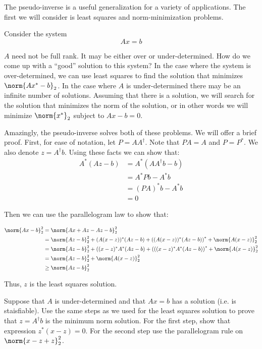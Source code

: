 

The pseudo-inverse is a useful generalization for a variety of applications. The first we will consider is least squares and norm-minimization problems.

Consider the system
\[
Ax = b
\]

$A$ need not be full rank. It may be either over or under-determined. How do we come up with a ``good'' solution to this system? In the case where the system is over-determined, we can use least squares to find the solution that minimizes $\norm{Ax^* - b}_2$. In the case where $A$ is under-determined there may be an infinite number of solutions. Assuming that there is a solution, we will search for the solution that minimizes the norm of the solution, or in other words we will minimize $\norm{x^*}_2$ subject to $Ax-b = 0$.

Amazingly, the pseudo-inverse solves both of these problems. We will offer a brief proof. First, for ease of notation, let $P = A A^\dagger$. Note that $PA = A$ and $P = P^*$. We also denote $z = A^\dagger b$. Using these facts we can show that:
\begin{align*}
A^*(Az-b) &= A^*(A A^\dagger b - b) \\
&= A^*P b - A^* b \\
&= (PA)^* b - A^* b \\
&= 0
\end{align*}

Then we can use the parallelogram law to show that:

\begin{align*}
\norm{Ax-b}_2^2 &= \norm{Ax + Az-Az-b}_2^2 \\
&= \norm{Az-b}_2^2 + (A(x-z))^*(Az-b) + \left((A(x-z))^*(Az-b)\right)^* + \norm{A(x-z)}_2^2 \\
&= \norm{Az-b}_2^2 + ((x-z)^*A^*(Az-b) + \left(((x-z)^*A^*(Az-b)\right)^* + \norm{A(x-z)}_2^2 \\
&= \norm{Az-b}_2^2 + \norm{A(x-z)}_2^2 \\
&\geq \norm{Az-b}_2^2
\end{align*}

Thus, $z$ is the least squares solution.

\begin{problem}
Suppose that $A$ is under-determined and that $Ax = b$ has a solution (i.e. is staisfiable). Use the same steps as we used for the least squares solution to prove that $z = A^\dagger b$ is the minimum norm solution. For the first step, show that expression $z^*(x-z) = 0$. For the second step use the parallelogram rule on $\norm{x -z +z}_2^2$.
\end{problem}

